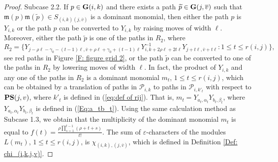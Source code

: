 \documentclass[12pt, reqno]{amsart}
\numberwithin{equation}{section}
\begin{document}
{\begin{proof}
Subcase 2.2. If $p \in {\bf G}(i,k)$ and there exists a path $\widetilde{p}\in {\bf G}(j, \overline{v})$ such that $\mathfrak{m}(p)\mathfrak{m}(\widetilde{p}) \in S_{(i, k)(j, \overline{v})}$ is a dominant monomial, then either the path $p$ is $Y_{i,k}$ or the path $p$ can be converted to $Y_{i,k}$ by raising moves of width $\ell$. Moreover, either the path $\widetilde{p}$ is one of the paths in $R_2$, where
\[
R_2=\{Y_{j-\rho \ell- \gamma_0-(t-1)\ell,\overline{v}+\rho \ell+\gamma_0+(t-1)\ell}Y_{i,k+2\rho \ell+2t \ell}^{-1}Y_{j+t \ell,\overline{v}+t \ell}: 1\leq t\leq r(i,j)\},
\]
see red paths in Figure \ref{F: figure grid 2}, or the path $\widetilde{p}$ can be converted to one of the paths in $R_2$ by lowering moves of width $\ell$. In fact, the product of $Y_{i,k}$ and any one of the paths in $R_2$ is a dominant monomial $m_t$, $1\leq t\leq r(i,j)$, which can be obtained by a translation of paths in $\mathscr{P}_{i,k}$ to paths in $\mathscr{P}_{i,k'_t}$ with respect to ${\bf PS}(j,v)$, where $k'_t$ is defined in (\ref{eq:def of rij}). That is, $m_t=Y_{a_t,\alpha_t}Y_{b_t,\beta_t}$, where $Y_{a_t,\alpha_t}Y_{b_t,\beta_t}$ is defined in (\ref{Eq:a_tb_t}). Using the same calculation method as Subcase 1.3, we obtain that the multiplicity of the dominant monomial $m_t$ is equal to $f(t) = \frac{ \rho \prod_{s=1}^{t-1}(\rho+t+s)}{t!}$. The sum of $\varepsilon$-characters of the modules $L(m_t)$, $1\leq t\leq r(i,j)$, is $\chi_{(i,k),(j,\overline{v})}$, which is defined in Definition \ref{Def: chi_(i,k,j,v)}.


\end{proof}}
\end{document}
